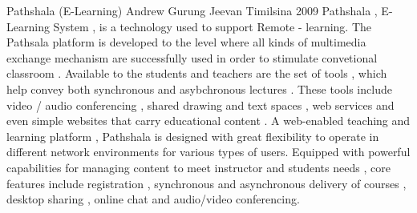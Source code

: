  \begin{conf-abstract}[]
{Pathshala (E-Learning) }
{
Andrew Gurung
Jeevan Timilsina
}
{2009 }
 Pathshala , E-Learning System , is a technology used to support Remote - learning. The Pathsala platform is developed to the level where all kinds of multimedia exchange mechanism are successfully used in order to stimulate convetional classroom . Available to the students and teachers are the set of tools , which help convey both synchronous and asybchronous lectures . These tools include video / audio conferencing , shared drawing and text spaces , web services and even simple websites that  carry educational content . A web-enabled  teaching and learning platform ,  Pathshala is designed with great flexibility to operate in different network environments for various types of users. Equipped with powerful capabilities for managing content to meet instructor and students needs , core features include registration , synchronous and asynchronous delivery of courses , desktop sharing , online chat and audio/video conferencing.  
  \end{conf-abstract}